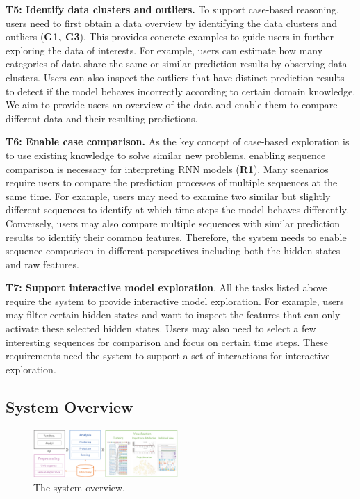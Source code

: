 \textbf{T5: Identify data clusters and outliers.}
To support case-based reasoning, users need to first obtain a data overview by identifying the data clusters and outliers (\textbf{G1, G3}).
This provides concrete examples to guide users in further exploring the data of interests.
For example, users can estimate how many categories of data share the same or similar prediction results by observing data clusters.
Users can also inspect the outliers that have distinct prediction results to detect if the model behaves incorrectly according to certain domain knowledge.
We aim to provide users an overview of the data and enable them to compare different data and their resulting predictions.

\textbf{T6: Enable case comparison.}
As the key concept of case-based exploration is to use existing knowledge to solve similar new problems, enabling sequence comparison is necessary for interpreting RNN models (\textbf{R1}). 
Many scenarios require users to compare the prediction processes of multiple sequences at the same time.
For example, users may need to examine two similar but slightly different sequences to identify at which time steps the model behaves differently.
Conversely, users may also compare multiple sequences with similar prediction results to identify their common features.
Therefore, the system needs to enable sequence comparison in different perspectives including both the hidden states and raw features.


\textbf{T7: Support interactive model exploration}.
All the tasks listed above require the system to provide interactive model exploration.
For example, users may filter certain hidden states and want to inspect the features that can only activate these selected hidden states.
Users may also need to select a few interesting sequences for comparison and focus on certain time steps.
These requirements need the system to support a set of interactions for interactive exploration.

\subsection{System Overview}

\begin{figure}[t]
	\centering
    \includegraphics[width=0.49\textwidth]{pictures/System_framework.pdf}
	\vspace{-3mm}
	\caption{The system overview. 
	}
	\label{fig:system_framework}
	\vspace{-4mm}
\end{figure}


